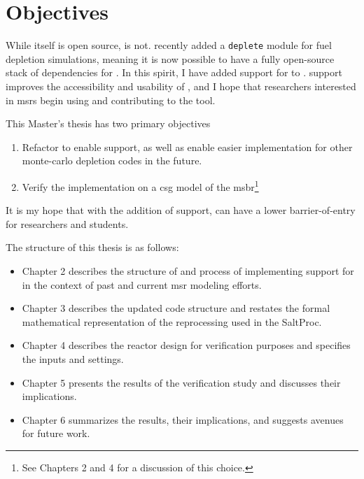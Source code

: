 \section{Objectives}%
\label{sec:objectives}

While \SaltProc itself is open source, \SerpentTWO is not. \OpenMC recently
added a \verb.deplete. module for fuel depletion simulations, meaning it is now
possible to have a fully open-source stack of dependencies for \SaltProc.
In this spirit, I have added support for \OpenMC to \SaltProc. \OpenMC support improves
the accessibility and usability of \SaltProc, and I hope that researchers
interested in \Gls{msr}s begin using and contributing to the tool.

This Master's thesis has two primary objectives
\begin{enumerate}
    \item Refactor \SaltProc to enable \OpenMC support, as well as enable
        easier implementation for other monte-carlo depletion codes in the
        future. 
    \item Verify the implementation on a \Gls{csg} model of the \Gls{msbr}\footnote{See
        Chapters 2 and 4 for a discussion of this choice.}
\end{enumerate}

It is my hope that with the addition of \OpenMC support, \SaltProc can have a
lower barrier-of-entry for researchers and students. 

The structure of this thesis is as follows:
\begin{itemize}
    \item Chapter 2 describes the structure of \SaltProc and process of
        implementing support for \OpenMC in the context of past and current
        \Gls{msr} modeling efforts.
    \item Chapter 3 describes the updated code structure and restates the
        formal mathematical representation of the reprocessing used in the
        SaltProc.
    \item Chapter 4 describes the reactor design for verification purposes and
        specifies the inputs and settings.
    \item Chapter 5 presents the results of the verification study and
        discusses their implications.
    \item Chapter 6 summarizes the results, their implications, and suggests
        avenues for future work.
\end{itemize}

